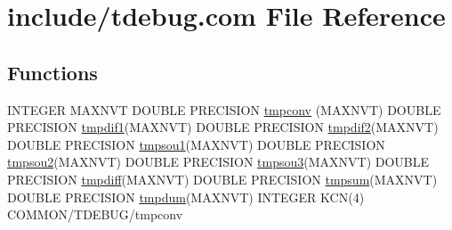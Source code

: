 \hypertarget{tdebug_8com}{\section{include/tdebug.com File Reference}
\label{tdebug_8com}
}
\subsection*{Functions}
\begin{DoxyCompactItemize}
\item 
I\-N\-T\-E\-G\-E\-R M\-A\-X\-N\-V\-T D\-O\-U\-B\-L\-E P\-R\-E\-C\-I\-S\-I\-O\-N \hyperlink{tdebug_8com_afd5e6e7ac20f6e7f0166c993ec74b22e}{tmpconv} (M\-A\-X\-N\-V\-T) D\-O\-U\-B\-L\-E P\-R\-E\-C\-I\-S\-I\-O\-N \hyperlink{tdebug_8com_a7d0989f9a38016617ca1bc61561d66ff}{tmpdif1}(M\-A\-X\-N\-V\-T) D\-O\-U\-B\-L\-E P\-R\-E\-C\-I\-S\-I\-O\-N \hyperlink{tdebug_8com_ab964a6f708f4f29204794080b9468323}{tmpdif2}(M\-A\-X\-N\-V\-T) D\-O\-U\-B\-L\-E P\-R\-E\-C\-I\-S\-I\-O\-N \hyperlink{tdebug_8com_a023b3a6f5da0440dce335a556cb89fe6}{tmpsou1}(M\-A\-X\-N\-V\-T) D\-O\-U\-B\-L\-E P\-R\-E\-C\-I\-S\-I\-O\-N \hyperlink{tdebug_8com_a7e31143aa010697a65a7ffe87ef242e7}{tmpsou2}(M\-A\-X\-N\-V\-T) D\-O\-U\-B\-L\-E P\-R\-E\-C\-I\-S\-I\-O\-N \hyperlink{tdebug_8com_aa8356e45fafae8344ea4ae9ccfe00326}{tmpsou3}(M\-A\-X\-N\-V\-T) D\-O\-U\-B\-L\-E P\-R\-E\-C\-I\-S\-I\-O\-N \hyperlink{tdebug_8com_a5fcc422c86549ee48051b12b4b0b9003}{tmpdiff}(M\-A\-X\-N\-V\-T) D\-O\-U\-B\-L\-E P\-R\-E\-C\-I\-S\-I\-O\-N \hyperlink{tdebug_8com_af2cc9aa6a0cb8a889362cdb7fc0977ea}{tmpsum}(M\-A\-X\-N\-V\-T) D\-O\-U\-B\-L\-E P\-R\-E\-C\-I\-S\-I\-O\-N \hyperlink{tdebug_8com_a85a53731c75ba4f8b2fb687cdcbe3f66}{tmpdum}(M\-A\-X\-N\-V\-T) I\-N\-T\-E\-G\-E\-R K\-C\-N(4) C\-O\-M\-M\-O\-N/T\-D\-E\-B\-U\-G/tmpconv
\end{DoxyCompactItemize}
